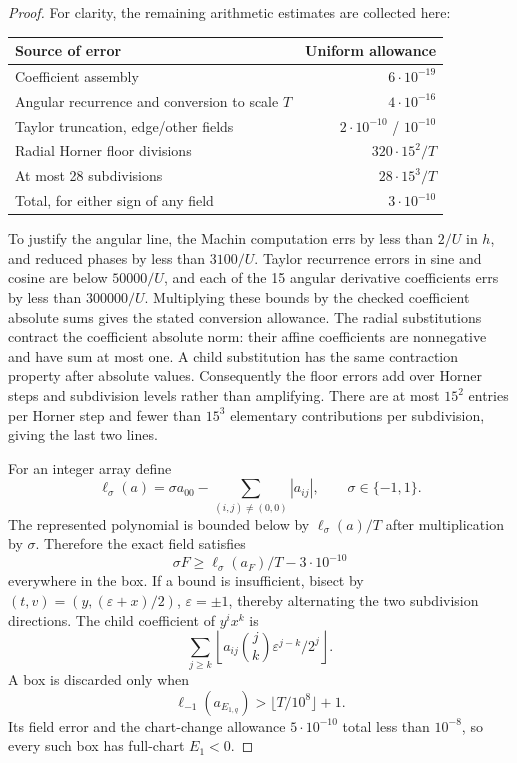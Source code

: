 \documentclass[11pt]{article}
\numberwithin{equation}{section}
\theoremstyle{definition}
\theoremstyle{remark}
\begin{document}
\begin{proof}
For clarity, the remaining arithmetic estimates are collected here:
\begin{center}
\begin{tabular}{lr}\toprule
Source of error&Uniform allowance\\\midrule
Coefficient assembly&$6\cdot10^{-19}$\\
Angular recurrence and conversion to scale $T$&$4\cdot10^{-16}$\\
Taylor truncation, edge/other fields&$2\cdot10^{-10}$ / $10^{-10}$\\
Radial Horner floor divisions&$320\cdot15^2/T$\\
At most 28 subdivisions&$28\cdot15^3/T$\\\midrule
Total, for either sign of any field&$3\cdot10^{-10}$\\\bottomrule
\end{tabular}
\end{center}
To justify the angular line, the Machin computation errs by less than
$2/U$ in $h$, and reduced phases by less than $3100/U$.  Taylor recurrence
errors in sine and cosine are below $50000/U$, and each of the 15
angular derivative coefficients errs by less than $300000/U$.  Multiplying
these bounds by the checked coefficient absolute sums gives the stated
conversion allowance.  The radial substitutions contract the coefficient
absolute norm: their affine coefficients are nonnegative and have sum at
most one.  A child substitution has the same contraction property after
absolute values.  Consequently the floor errors add over Horner steps and
subdivision levels rather than amplifying.  There are at most $15^2$
entries per Horner step and fewer than $15^3$ elementary contributions
per subdivision, giving the last two lines.

For an integer array define
\[
 \ell_\sigma(a)=\sigma a_{00}-\sum_{(i,j)\ne(0,0)}|a_{ij}|,
       \qquad\sigma\in\{-1,1\}.
\]
The represented polynomial is bounded below by
$\ell_\sigma(a)/T$ after multiplication by $\sigma$.  Therefore the exact
field satisfies
\begin{equation}\label{cert:jet-lower}
 \sigma F\geq\ell_\sigma(a_F)/T-3\cdot10^{-10}
\end{equation}
everywhere in the box.  If a bound is insufficient, bisect by
$(t,v)=(y,(\varepsilon+x)/2)$, $\varepsilon=\pm1$, thereby alternating
the two subdivision directions.  The child coefficient of $y^ix^k$ is
\[
 \sum_{j\geq k}\left\lfloor
       a_{ij}\binom jk\varepsilon^{j-k}/2^j\right\rfloor.
\]
A box is discarded only when
\begin{equation}\label{cert:outside-test}
 \ell_{-1}(a_{E_{1,q}})>\lfloor T/10^8\rfloor+1.
\end{equation}
Its field error and the chart-change allowance $5\cdot10^{-10}$ total
less than $10^{-8}$, so every such box has full-chart $E_1<0$.


\end{proof}
\end{document}
